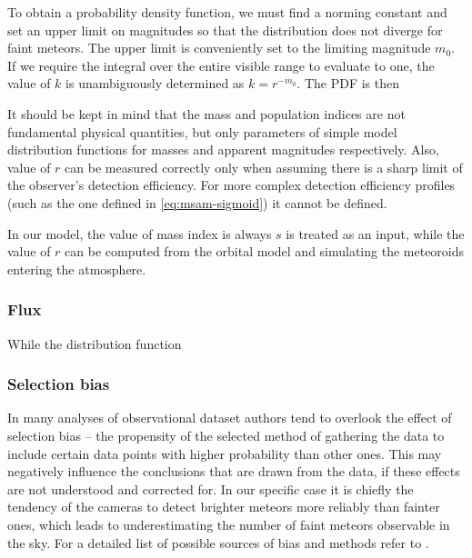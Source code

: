             To obtain a probability density function, we must find a norming constant
            and set an upper limit on magnitudes so that the distribution does not diverge for faint meteors.
            The upper limit is conveniently set to the limiting magnitude $m_0$.
            If we require the integral over the entire visible range to evaluate to one,
            the value of $k$ is unambiguously determined as $k = r^{-m_0}$.
            The PDF is then

            It should be kept in mind that the mass and population indices are not fundamental physical quantities,
            but only parameters of simple model distribution functions for masses and apparent magnitudes respectively.
            Also, value of $r$ can be measured correctly only when assuming there is a sharp limit of the observer's detection efficiency.
            For more complex detection efficiency profiles (such as the one defined in \cref{eq:msam-sigmoid})
            it cannot be defined.

            In our model, the value of mass index is always $s$ is treated as an input,
            while the value of $r$ can be computed from the orbital model and simulating the meteoroids entering the atmosphere.

        \subsubsection{Flux} \label{msaf}
            While the distribution function 

        \subsubsection{Selection bias} \label{msab}
            In many analyses of observational dataset authors tend to overlook the effect of selection bias --  the
            propensity of the selected method of gathering the data to include certain data points with higher probability than other ones.
            This may negatively influence the conclusions that are drawn from the data, if these effects are not understood and corrected for.
            In our specific case it is chiefly the tendency of the cameras to detect brighter meteors more reliably than fainter ones,
            which leads to underestimating the number of faint meteors observable in the sky.
            For a detailed list of possible sources of bias and methods refer to \citep{balaz-thesis}.

